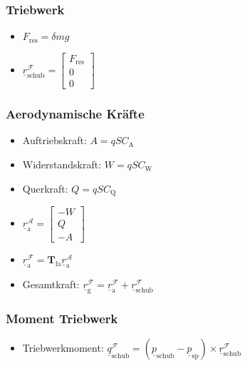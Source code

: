 \documentclass[10pt,a4paper]{article}
\begin{document}
\subsubsection{Triebwerk}
\begin{itemize}
\item $F_\mathrm{res} = \delta mg$
\item $\underline{r}^\mathcal{F}_\mathrm{schub} = \begin{bmatrix} 
F_\mathrm{res}\\
0\\
0
\end{bmatrix}$ 
\end{itemize}
\subsubsection{Aerodynamische Kräfte}
\begin{itemize}
\item Auftriebskraft: $A = qSC_\mathrm{A}$
\item Widerstandskraft: $W = qSC_\mathrm{W}$
\item Querkraft: $Q = qSC_\mathrm{Q}$
\item $\underline{r}^\mathcal{A}_\mathrm{a} = \begin{bmatrix} 
-W\\
Q\\
-A
\end{bmatrix}$  
\item $\underline{r}^\mathcal{F}_\mathrm{a} = \textbf{T}_\mathrm{fa}\underline{r}^\mathcal{A}_\mathrm{a}$
\item Gesamtkraft: $\underline{r}^\mathcal{F}_\mathrm{g} = \underline{r}^\mathcal{F}_\mathrm{a} + \underline{r}^\mathcal{F}_\mathrm{schub}$
\end{itemize}
\subsubsection{Moment Triebwerk}
\begin{itemize}
\item Triebwerkmoment: $\underline{q}^\mathcal{F}_\mathrm{schub} = (\underline{p}_\mathrm{schub}-\underline{p}_\mathrm{sp})\times\underline{r}^\mathcal{F}_\mathrm{schub}$
\end{itemize}
\end{document}
